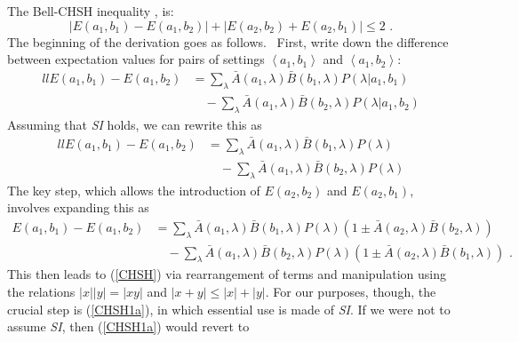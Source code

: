 \documentclass[12pt]{article}%
\begin{document}
The Bell-CHSH inequality \cite{CHSH69}, is:%
\begin{equation}
\left\vert E(a_{1},b_{1})-E(a_{1},b_{2})\right\vert +\left\vert E(a_{2}%
,b_{2})+E(a_{2},b_{1})\right\vert \leq2\text{ .} \label{CHSH}%
\end{equation}
The beginning of the derivation goes as follows. \ First, write down the
difference between expectation values for pairs of settings $\left\langle
a_{1},b_{1}\right\rangle $ and $\left\langle a_{1},b_{2}\right\rangle :$%
\begin{align}%
[c]{ll}%
E(a_{1},b_{1})-E(a_{1},b_{2}) & =%
{\displaystyle\sum\limits_{\lambda}}
\bar{A}(a_{1},\lambda)\bar{B}(b_{1},\lambda)P(\lambda|a_{1},b_{1})\nonumber\\
& \quad -%
{\displaystyle\sum\limits_{\lambda}}
\bar{A}(a_{1},\lambda)\bar{B}(b_{2},\lambda)P(\lambda|a_{1},b_{2})
\label{CHSH1}%
\end{align}
Assuming that \emph{SI} holds, we can rewrite this as%
\begin{align}%
[c]{ll}%
E(a_{1},b_{1})-E(a_{1},b_{2})  & =%
{\displaystyle\sum\limits_{\lambda}}
\bar{A}(a_{1},\lambda)\bar{B}(b_{1},\lambda)P(\lambda)\\
& \quad -%
{\displaystyle\sum\limits_{\lambda}}
\bar{A}(a_{1},\lambda)\bar{B}(b_{2},\lambda)P(\lambda)
\label{CHSH1a}%
\end{align}
The key step, which allows the introduction of $E(a_{2},b_{2})$ and
$E(a_{2},b_{1})$, involves expanding this as
\begin{align}
E(a_{1},b_{1})-E(a_{1},b_{2}) &=
{\displaystyle\sum\limits_{\lambda}}
\bar{A}(a_{1},\lambda)\bar{B}(b_{1},\lambda)P(\lambda)(1\pm\bar{A}%
(a_{2},\lambda)\bar{B}(b_{2},\lambda))\nonumber \\
& \quad - 
{\displaystyle\sum\limits_{\lambda}}
\bar{A}(a_{1},\lambda)\bar{B}(b_{2},\lambda)P(\lambda)(1\pm\bar{A}%
(a_{2},\lambda)\bar{B}(b_{1},\lambda))\text{ .}%
\label{CHSH1b}%
\end{align}
This then leads to (\ref{CHSH}) via rearrangement of terms and manipulation
using the relations $\left\vert x\right\vert \left\vert y\right\vert
=\left\vert xy\right\vert $ and $\left\vert x+y\right\vert \leq\left\vert
x\right\vert +\left\vert y\right\vert $. For our purposes, though, the crucial
step is (\ref{CHSH1a}), in which essential use is made of \emph{SI}. If we
were not to assume \emph{SI}, then (\ref{CHSH1a}) would revert to
\end{document}
